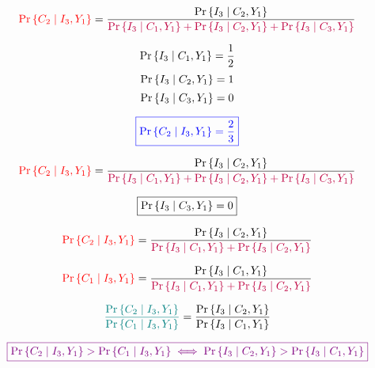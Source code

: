 \begin{frame}{}
  \begin{align*}
    \textcolor{red}{\Pr\left\{C_2 \mid I_3, Y_1\right\}} = \frac{\Pr{\left\{I_3 \mid C_2, Y_1\right\}}}
      {\textcolor{purple}{\Pr\left\{I_3 \mid C_1, Y_1\right\} + \Pr\left\{I_3 \mid C_2, Y_1\right\} + \Pr\left\{I_3 \mid C_3, Y_1\right\}}}
  \end{align*}

  \pause
  \vspace{0.30cm}
  \centerline{}

  \pause
  \vspace{0.30cm}
  \[
    \Pr\left\{I_3 \mid C_1, Y_1\right\} = \frac{1}{2}
  \]
  \pause
  \vspace{-0.40cm}
  \[
    \Pr\left\{I_3 \mid C_2, Y_1\right\} = 1
  \]
  \pause
  \vspace{-0.40cm}
  \[
    \Pr\left\{I_3 \mid C_3, Y_1\right\} = 0
  \]

  \pause
  \[
    \textcolor{blue}{\boxed{\Pr\left\{C_2 \mid I_3, Y_1\right\} = \frac{2}{3}}}
  \]
\end{frame}

\begin{frame}{}
  \[
    \textcolor{red}{\Pr\left\{C_2 \mid I_3, Y_1\right\}} = \frac{\Pr{\left\{I_3 \mid C_2, Y_1\right\}}}
      {\textcolor{purple}{\Pr\left\{I_3 \mid C_1, Y_1\right\} + \Pr\left\{I_3 \mid C_2, Y_1\right\} + \Pr\left\{I_3 \mid C_3, Y_1\right\}}}
  \]

  \pause
  \[
    \boxed{\Pr\left\{I_3 \mid C_3, Y_1\right\} = 0}
  \]

  \pause
  \[
    \textcolor{red}{\Pr\left\{C_2 \mid I_3, Y_1\right\}} = \frac{\Pr{\left\{I_3 \mid C_2, Y_1\right\}}}
      {\textcolor{purple}{\Pr\left\{I_3 \mid C_1, Y_1\right\} + \Pr\left\{I_3 \mid C_2, Y_1\right\}}}
  \]

  \pause
  \[
    \textcolor{red}{\Pr\left\{C_1 \mid I_3, Y_1\right\}} = \frac{\Pr{\left\{I_3 \mid C_1, Y_1\right\}}}
      {\textcolor{purple}{\Pr\left\{I_3 \mid C_1, Y_1\right\} + \Pr\left\{I_3 \mid C_2, Y_1\right\}}}
  \]

  \pause
  \[
    \textcolor{teal}{\frac{\Pr\left\{C_2 \mid I_3, Y_1\right\}}{\Pr\left\{C_1 \mid I_3, Y_1\right\}}} = \frac{\Pr{\left\{I_3 \mid C_2, Y_1\right\}}}
    {\Pr\left\{I_3 \mid C_1, Y_1\right\}}
  \]

  \pause
  \[
    \textcolor{violet}{\boxed{\Pr\left\{C_2 \mid I_3, Y_1\right\} > \Pr\left\{C_1 \mid I_3, Y_1\right\} \iff \Pr{\left\{I_3 \mid C_2, Y_1\right\}} > \Pr{\left\{I_3 \mid C_1, Y_1\right\}}}}
  \]
\end{frame}

